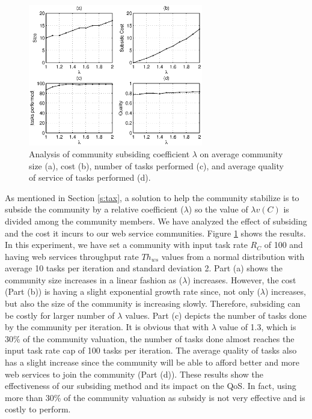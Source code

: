 \documentclass[10pt,journal,cspaper,compsoc]{IEEEtran}
\begin{document}
\begin{figure}%
\centering
\includegraphics[width=3in]{taxtation.eps}
\caption{Analysis of community subsiding coefficient $\lambda$ on
average community size (a), cost (b), number of tasks performed
(c), and average quality of service of tasks performed (d).}
\label{f_taxtation}
\end{figure}

As mentioned in Section \ref{s:tax}, a solution to help the
community stabilize is to subside the community by a relative
coefficient ($\lambda$) so the value of $\lambda v(C)$ is divided
among the community members. We have analyzed the effect of
subsiding and the cost it incurs to our web service communities.
Figure \ref{f_taxtation} shows the results. In this experiment, we
have set a community with input task rate $R_C$ of 100 and having
web services throughput rate $Th_{ws}$ values from a normal
distribution with average 10 tasks per iteration and standard
deviation 2. Part (a) shows the community size increases in a
linear fashion as ($\lambda$) increases. However, the cost (Part
(b)) is having a slight exponential growth rate since, not only
($\lambda$) increases, but also the size of the community is
increasing slowly. Therefore, subsiding can be costly for larger
number of $\lambda$ values. Part (c) depicts the number of tasks
done by the community per iteration. It is obvious that with
$\lambda$ value of 1.3, which is 30\% of the community valuation,
the number of tasks done almost reaches the input task rate cap of
100 tasks per iteration. The average quality of tasks also has a
slight increase since the community will be able to afford better
and more web services to join the community (Part (d)). These
results show the effectiveness of our subsiding method and its
impact on the QoS. In fact, using more than 30\% of the community
valuation as subsidy is not very effective and is costly to
perform.
\end{document}
